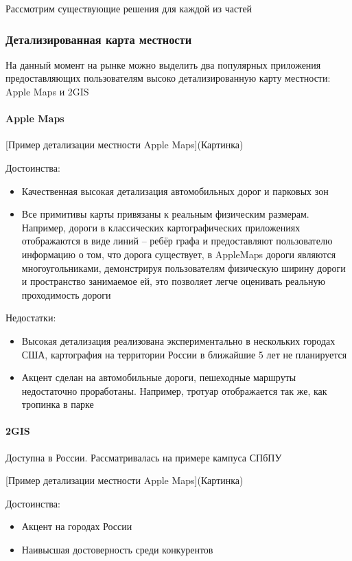     Рассмотрим существующие решения для каждой из частей

    \subsubsection{Детализированная карта местности}
      На данный момент на рынке можно выделить два популярных приложения предоставляющих пользователям высоко детализированную карту местности: Apple Maps и 2GIS
      \paragraph{Apple Maps}
        [Пример детализации местности Apple Maps](Картинка)

        \noindent Достоинства:
        \begin{itemize}
          \item Качественная высокая детализация автомобильных дорог и парковых зон
          \item Все примитивы карты привязаны к реальным физическим размерам. Например, дороги в классических картографических приложениях отображаются в виде линий -- ребёр графа и предоставляют пользователю информацию о том, что дорога существует, в AppleMaps дороги являются многоугольниками, демонстрируя пользователям физическую ширину дороги и пространство занимаемое ей, это позволяет легче оценивать реальную проходимость дороги
        \end{itemize}

        \noindent Недостатки:
        \begin{itemize}
          \item Высокая детализация реализована экспериментально в нескольких городах США, картография на территории России в ближайшие 5 лет не планируется
          \item Акцент сделан на автомобильные дороги, пешеходные маршруты недостаточно проработаны. Например, тротуар отображается так же, как тропинка в парке
        \end{itemize}

      \paragraph{2GIS}
        Доступна в России. Рассматривалась на примере кампуса СПбПУ

        [Пример детализации местности Apple Maps](Картинка)

        \noindent Достоинства:
        \begin{itemize}
          \item Акцент на городах России
          \item Наивысшая достоверность среди конкурентов
        \end{itemize}

